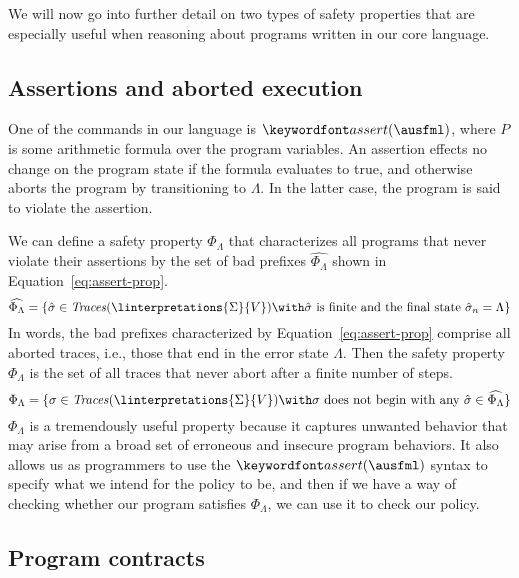 \documentclass[11pt,twoside]{scrartcl}
\newcommand{\errstate}{\ensuremath{\Lambda}\xspace}
\begin{document}
We will now go into further detail on two types of safety properties that are especially useful when reasoning about programs written in our core language.

\subsection{Assertions and aborted execution}

One of the commands in our language is $\passert{\ausfml}$, where $P$ is some arithmetic formula over the program variables. An assertion effects no change on the program state if the formula evaluates to true, and otherwise aborts the program by transitioning to \errstate. In the latter case, the program is said to violate the assertion.

We can define a safety property $\Phi_\errstate$ that characterizes all programs that never violate their assertions by the set of bad prefixes $\widehat{\Phi_\errstate}$ shown in Equation~\ref{eq:assert-prop}.
\begin{equation}
\label{eq:assert-prop}
\widehat{\Phi_\errstate} = \{\hat{\atrace} \in \ttraces{\linterpretations{\Sigma}{V}} \with \hat{\atrace}~\text{is finite and the final state}~\hat{\atrace}_n = \errstate\}
\end{equation}
In words, the bad prefixes characterized by Equation~\ref{eq:assert-prop} comprise all aborted traces, i.e., those that end in the error state \errstate. Then the safety property $\Phi_\errstate$ is the set of all traces that never abort after a finite number of steps.
\begin{equation}
\Phi_\errstate = \{\atrace \in \ttraces{\linterpretations{\Sigma}{V}} \with \atrace~\text{does not begin with any}~\hat{\atrace}\in\widehat{\Phi_\errstate}\}
\end{equation}
$\Phi_\errstate$ is a tremendously useful property because it captures unwanted behavior that may arise from a broad set of erroneous and insecure program behaviors.
It also allows us as programmers to use the $\passert{\ausfml}$ syntax to specify what we intend for the policy to be, and then if we have a way of checking whether our program satisfies $\Phi_\errstate$, we can use it to check our policy.

\subsection{Program contracts}
\end{document}

